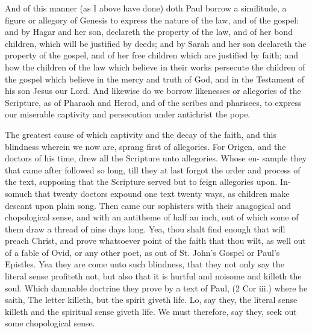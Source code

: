 \documentclass{custom}
\begin{document}
And of this manner (as I above have done) doth Paul 
borrow a similitude, a figure or allegory of Genesis to 
express the nature of the law, and of the gospel: and by 
Hagar and her son, declareth the property of the law, and
of her bond children, which will be justified by deeds;
and by Sarah and her son declareth the property of the 
gospel, and of her free children which are justified by faith; 
and how the children of the law which believe in their 
works persecute the children of the gospel which believe 
in the mercy and truth of God, and in the Testament of 
his son Jesus our Lord. And likewise do we borrow 
likenesses or allegories of the Scripture, as of Pharaoh 
and Herod, and of the scribes and pharisees, to express our 
miserable captivity and persecution under antichrist the pope. 

The greatest cause of which captivity and the decay of 
the faith, and this blindness wherein we now are, sprang
first of allegories. For Origen, and the doctors of his
time, drew all the Scripture unto allegories. Whose en- 
sample they that came after followed so long, till they at 
last forgot the order and process of the text, supposing 
that the Scripture served but to feign allegories upon. In- 
somuch that twenty doctors expound one text twenty ways, 
as children make descant upon plain song. Then came 
our sophisters with their anagogical and chopological sense, 
and with an antitheme of half an inch, out of which some 
of them draw a thread of nine days long. Yea, thou shalt 
find enough that will preach Christ, and prove whatsoever 
point of the faith that thou wilt, as well out of a fable of 
Ovid, or any other poet, as out of St. John's Gospel or 
Paul's Epistles. Yea they are come unto such blindness, 
that they not only say the literal sense profiteth not, but 
also that it is hurtful and noisome and killeth the soul. 
Which damnable doctrine they prove by a text of Paul, 
(2 Cor iii.) where he saith, The letter killeth, but the 
spirit giveth life. Lo, say they, the literal sense killeth 
and the spiritual sense giveth life. We must therefore, 
say they, seek out some chopological sense. 
\end{document}
